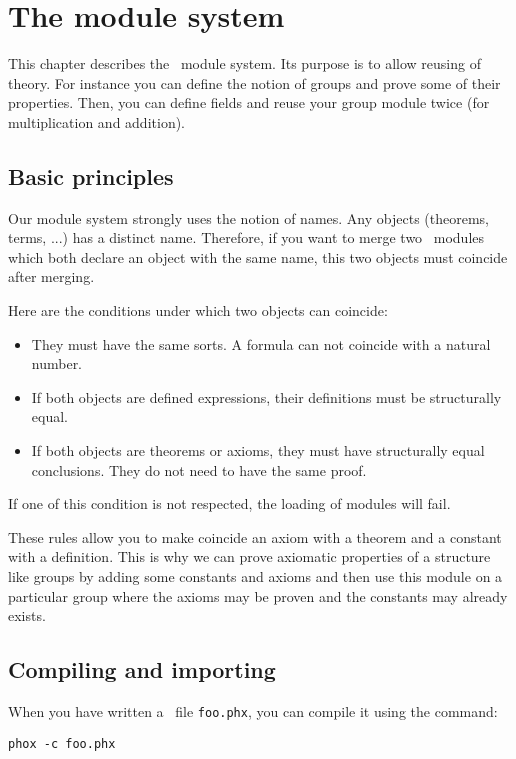 
\chapter{The module system}


This chapter describes the \AFD\ module system. Its purpose is to allow
reusing of theory. For instance you can define the notion of groups and prove
some of their properties. Then, you can define fields and reuse your group
module twice (for multiplication and addition).

\section{Basic principles}

Our module system strongly uses the notion of names. Any objects (theorems,
terms, ...) has a distinct name. Therefore, if you want to merge two \AFD\
modules which both declare an object with the same name, this two objects must
coincide after merging.   

Here are the conditions under which two objects can coincide:
\begin{itemize}
\item They must have the same sorts. A formula can not coincide with a
natural number.
\item If both objects are defined expressions, their definitions must be
structurally equal.
\item If both objects are theorems or axioms, they must have structurally equal
conclusions. They do not need to have the same proof.
\end{itemize}

If one of this condition is not respected, the loading of modules will fail.

These rules allow you to make coincide an axiom with a theorem and a constant
with a definition. This is why we can prove axiomatic properties of a
structure like groups by adding some constants and axioms and then use this
module on a particular group where the axioms may be proven and the constants
may already exists.

\section{Compiling and importing}

When you have written a \AFD\ file {\tt foo.phx}, you can compile it using the command:
\begin{verbatim}
phox -c foo.phx
\end{verbatim}

